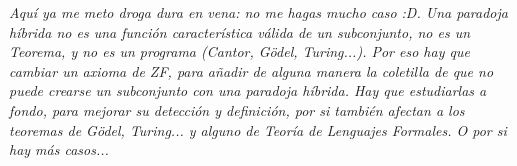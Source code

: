 	\noindent
	\textit{Aquí ya me meto droga dura en vena: no me hagas mucho caso :D. Una paradoja híbrida no es una función característica válida de un subconjunto, no es un Teorema, y no es un programa (Cantor, Gödel, Turing...). Por eso hay que cambiar un axioma de ZF, para añadir de alguna manera la coletilla de que no puede crearse un subconjunto con una paradoja híbrida. Hay que estudiarlas a fondo, para mejorar su detección y definición, por si también afectan a los teoremas de Gödel, Turing... y alguno de Teoría de Lenguajes Formales. O por si hay más casos...}\\\\
	
	

	
	
	
	
	
	
	
	



